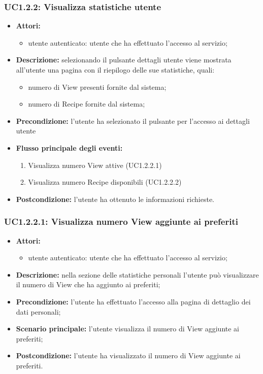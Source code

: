 \subsubsection{UC1.2.2: Visualizza statistiche utente}
\begin{itemize}
	\item \textbf{Attori:}
	\begin{itemize}
		\item utente autenticato: utente che ha effettuato l'accesso al servizio;
	\end{itemize}
	\item \textbf{Descrizione:} selezionando il pulsante dettagli utente viene mostrata all'utente una pagina con il riepilogo delle sue statistiche, quali:
	\begin{itemize}
		\item numero di View presenti fornite dal sistema;
		\item numero di Recipe fornite dal sistema;
	\end{itemize}
  \item \textbf{Precondizione:} l'utente ha selezionato il pulsante per l'accesso ai dettagli utente
	\item \textbf{Flusso principale degli eventi:}
	\begin{enumerate}
		\item Visualizza numero View attive (UC1.2.2.1)
		\item Visualizza numero Recipe disponibili (UC1.2.2.2)
	\end{enumerate}
	\item \textbf{Postcondizione:} l'utente ha ottenuto le informazioni richieste.
\end{itemize}

\subsubsection{UC1.2.2.1: Visualizza numero View aggiunte ai preferiti}
\begin{itemize}
	\item \textbf{Attori:}
	\begin{itemize}
		\item utente autenticato: utente che ha effettuato l'accesso al servizio;
	\end{itemize}
	\item \textbf{Descrizione:} nella sezione delle statistiche personali l'utente può visualizzare il numero di View che ha aggiunto ai preferiti;
	\item \textbf{Precondizione:} l'utente ha effettuato l'accesso alla pagina di dettaglio dei dati personali;
	\item \textbf{Scenario principale:} l'utente visualizza il numero di View aggiunte ai preferiti;
	\item \textbf{Postcondizione:} l'utente ha visualizzato il numero di View aggiunte ai preferiti.
\end{itemize}

